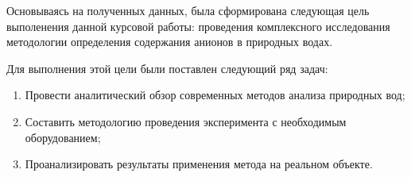 Основываясь на полученных данных, была сформирована следующая цель выполенения данной курсовой работы: проведения комплексного исследования методологии определения содержания анионов в природных водах.

Для выполнения этой цели были поставлен следующий ряд задач:
\begin{enumerate}[label=\arabic*., leftmargin=\parindent, nosep]
	\item Провести аналитический обзор современных методов анализа природных вод;
	\item Составить методологию проведения эксперимента с необходимым оборудованием;
	\item Проанализировать результаты применения метода на реальном объекте.
\end{enumerate}
